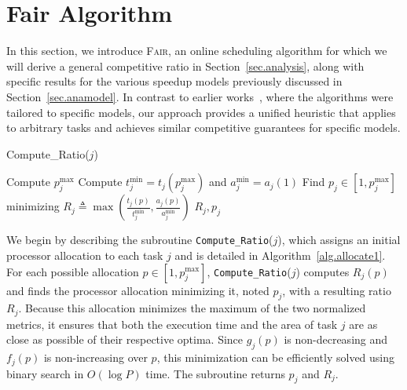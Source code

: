 \documentclass{article}
\newcommand\fair{\textsc{Fair}\xspace}
\newcommand\ratio{R\xspace}
\begin{document}
\section{Fair Algorithm}
\label{sec.alg}
In this section, we introduce \fair, an online scheduling algorithm for which we will derive a general competitive ratio in Section~\ref{sec.analysis}, along with specific results for the various speedup models previously discussed in Section~\ref{sec.anamodel}. In contrast to earlier works~\cite{ICPP22, TOPC24}, where the algorithms were tailored to specific models, our approach provides a unified heuristic that applies to arbitrary tasks and achieves similar competitive guarantees for specific models.

{
\begin{algorithm}[t]
    \footnotesize
	\caption{Compute\_Ratio($j$)}\label{alg.allocate1}
     
    \KwOut{Ratio $\ratio_j$ and processor allocation $p_j$} 
    Compute $p_j^{\max}$  
    Compute $t_j^{\min} = t_j(p_j^{\max})$ and $a_j^{\min} = a_j(1)$ 
    Find $p_j \in [1, p_j^{\max}]$ minimizing $\ratio_j \triangleq \max\left(\frac{t_j(p)}{t_j^{\min}}, \frac{a_j(p)}{a_j^{\min}}\right)$ 
    \Return $\ratio_j, p_j$
\end{algorithm}
}

We begin by describing the subroutine \texttt{Compute\_Ratio}($j$), which assigns an initial processor allocation to each task $j$ and is detailed in Algorithm~\ref{alg.allocate1}. For each possible allocation $p \in [1, p_j^{\max}]$, \texttt{Compute\_Ratio}($j$) computes  $\ratio_j(p)$ and finds the processor allocation minimizing it, noted $p_j$, with a resulting ratio $\ratio_j$. Because this allocation minimizes the maximum of the two normalized metrics, it ensures that both the execution time and the area of task $j$ are as close as possible of their respective optima. Since $g_j(p)$ is non-decreasing and $f_j(p)$ is non-increasing over $p$, this minimization can be efficiently solved using binary search in $O(\log P)$ time. The subroutine returns $p_j$ and $\ratio_j$.
\end{document}

